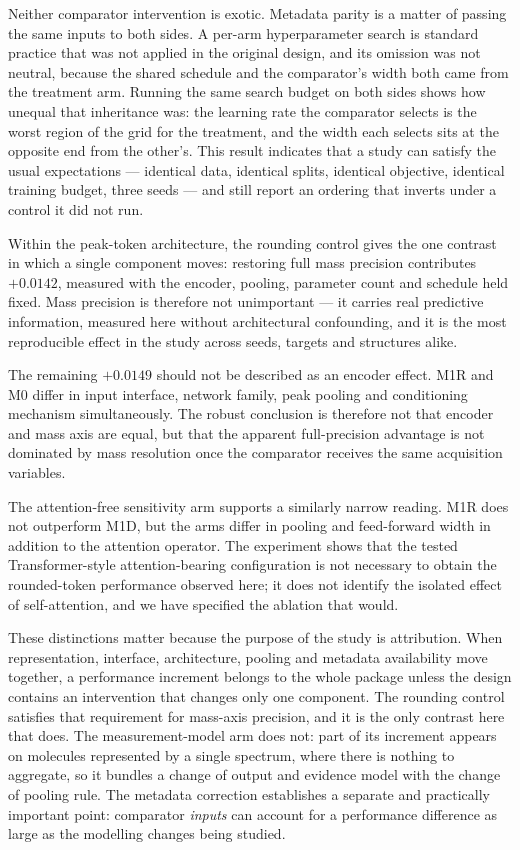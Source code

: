 \documentclass[11pt]{article}
\begin{document}
Neither comparator intervention is exotic. Metadata parity is a matter of passing the
same inputs to both sides. A per-arm hyperparameter search is standard practice that
was not applied in the original design, and its omission was not neutral, because the
shared schedule and the comparator's width both came from the treatment arm. Running
the same search budget on both sides shows how unequal that inheritance was: the
learning rate the comparator selects is the worst region of the grid for the
treatment, and the width each selects sits at the opposite end from the other's. This
result indicates that a study can satisfy the usual expectations --- identical data,
identical splits, identical objective, identical training budget, three seeds --- and
still report an ordering that inverts under a control it did not run.

Within the peak-token architecture, the rounding control gives the one contrast in which a single component moves: restoring full mass precision contributes $+0.0142$, measured with the encoder, pooling, parameter count and schedule held fixed. Mass precision is therefore not unimportant --- it carries real predictive information, measured here without architectural confounding, and it is the most reproducible effect in the study across seeds, targets and structures alike.

The remaining $+0.0149$ should not be described as an encoder effect. M1R and M0 differ in input interface, network family, peak pooling and conditioning mechanism simultaneously. The robust conclusion is therefore not that encoder and mass axis are equal, but that the apparent full-precision advantage is not dominated by mass resolution once the comparator receives the same acquisition variables.

The attention-free sensitivity arm supports a similarly narrow reading. M1R does not outperform M1D, but the arms differ in pooling and feed-forward width in addition to the attention operator. The experiment shows that the tested Transformer-style attention-bearing configuration is not necessary to obtain the rounded-token performance observed here; it does not identify the isolated effect of self-attention, and we have specified the ablation that would.

These distinctions matter because the purpose of the study is attribution. When representation, interface, architecture, pooling and metadata availability move together, a performance increment belongs to the whole package unless the design contains an intervention that changes only one component. The rounding control satisfies that requirement for mass-axis precision, and it is the only contrast here that does. The measurement-model arm does not: part of its increment appears on molecules represented by a single spectrum, where there is nothing to aggregate, so it bundles a change of output and evidence model with the change of pooling rule. The metadata correction establishes a separate and practically important point: comparator \emph{inputs} can account for a performance difference as large as the modelling changes being studied.
\end{document}
